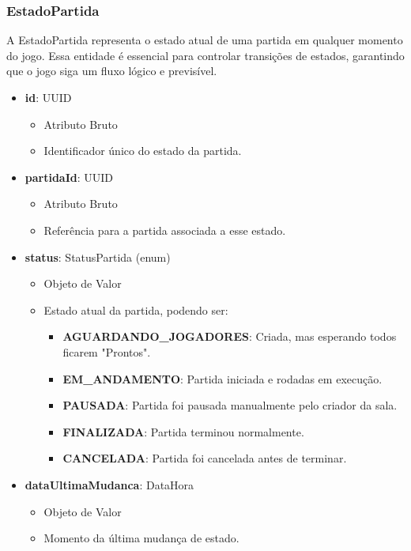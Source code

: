     \subsubsection{EstadoPartida}
    A EstadoPartida representa o estado atual de uma partida em qualquer momento do jogo. Essa entidade é essencial para controlar transições de estados, garantindo que o jogo siga um fluxo lógico e previsível.
    \begin{itemize}
        \item \textbf{id}: UUID  
              \begin{itemize}
                  \item Atributo Bruto
                  \item Identificador único do estado da partida.
              \end{itemize}
    
        \item \textbf{partidaId}: UUID  
              \begin{itemize}
                  \item Atributo Bruto
                  \item Referência para a partida associada a esse estado.
              \end{itemize}
    
        \item \textbf{status}: StatusPartida (enum)  
              \begin{itemize}
                  \item Objeto de Valor
                  \item Estado atual da partida, podendo ser:
                  \begin{itemize}
                      \item \textbf{AGUARDANDO\_JOGADORES}: Criada, mas esperando todos ficarem "Prontos".
                      \item \textbf{EM\_ANDAMENTO}: Partida iniciada e rodadas em execução.
                      \item \textbf{PAUSADA}: Partida foi pausada manualmente pelo criador da sala.
                      \item \textbf{FINALIZADA}: Partida terminou normalmente.
                      \item \textbf{CANCELADA}: Partida foi cancelada antes de terminar.
                  \end{itemize}
              \end{itemize}
    
        \item \textbf{dataUltimaMudanca}: DataHora  
              \begin{itemize}
                  \item Objeto de Valor
                  \item Momento da última mudança de estado.
              \end{itemize}
    \end{itemize}
